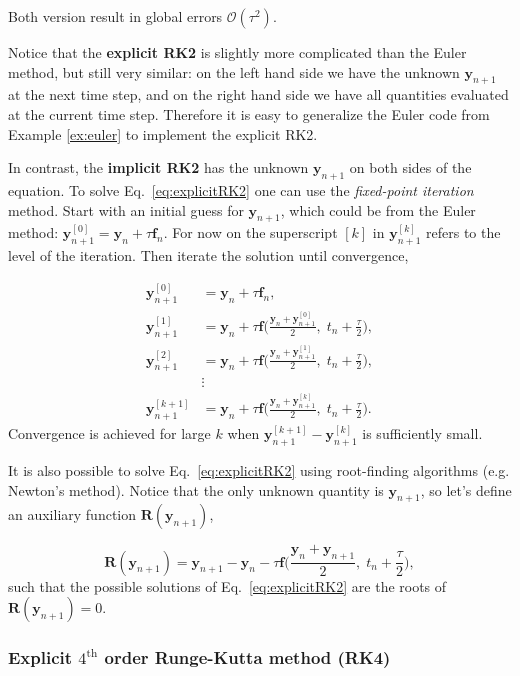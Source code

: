 Both version result in global errors $\mathcal{O}(\tau^2)$.

Notice that the \textbf{explicit RK2} is slightly more complicated than the Euler method, but still very similar: on the left hand side we have the unknown $\bm{y}_{n+1}$ at the next time step, and on the right hand side we have all quantities evaluated at the current time step. Therefore it is easy to generalize the Euler code from Example \ref{ex:euler} to implement the explicit RK2. 

In contrast, the \textbf{implicit RK2} has the unknown $\bm{y}_{n+1}$ on both sides of the equation. To solve Eq.~\eqref{eq:explicitRK2} one can use the \textit{fixed-point iteration} method. Start with an initial guess for $\bm{y}_{n+1}$, which could be from the Euler method: $\bm{y}_{n+1}^{[0]} = \bm{y}_n + \tau \bm{f}_n$. For now on the superscript $[k]$ in $\bm{y}_{n+1}^{[k]}$ refers to the level of the iteration. Then iterate the solution until convergence,

\begin{align}
 \bm{y}_{n+1}^{[0]} &= \bm{y}_n + \tau \bm{f}_n,\\
 \bm{y}_{n+1}^{[1]} &= \bm{y}_n + \tau \bm{f}\Big( \frac{\bm{y}_n + \bm{y}_{n+1}^{[0]}}{2} ,\; t_n+\frac{\tau}{2} \Big),\\
 \bm{y}_{n+1}^{[2]} &= \bm{y}_n + \tau \bm{f}\Big( \frac{\bm{y}_n + \bm{y}_{n+1}^{[1]}}{2} ,\; t_n+\frac{\tau}{2} \Big),\\
 &\vdots \\
 \bm{y}_{n+1}^{[k+1]} &= \bm{y}_n + \tau \bm{f}\Big( \frac{\bm{y}_n + \bm{y}_{n+1}^{[k]}}{2} ,\; t_n+\frac{\tau}{2} \Big).
\end{align}
Convergence is achieved for large $k$ when $\bm{y}_{n+1}^{[k+1]} - \bm{y}_{n+1}^{[k]}$ is sufficiently small.

It is also possible to solve Eq.~\eqref{eq:explicitRK2} using root-finding algorithms (e.g. Newton's method). Notice that the only unknown quantity is $\bm{y}_{n+1}$, so let's define an auxiliary function $\bm{R}(\bm{y}_{n+1})$,

\begin{equation}
 \bm{R}(\bm{y}_{n+1}) = \bm{y}_{n+1} - \bm{y}_n - \tau \bm{f}\Big( \frac{\bm{y}_n + \bm{y}_{n+1}}{2} ,\; t_n+\frac{\tau}{2} \Big),
\end{equation}
such that the possible solutions of Eq.~\eqref{eq:explicitRK2} are the roots of $\bm{R}(\bm{y}_{n+1}) = 0$.


\subsubsection*{Explicit $4^\text{th}$ order Runge-Kutta method (RK4)}

